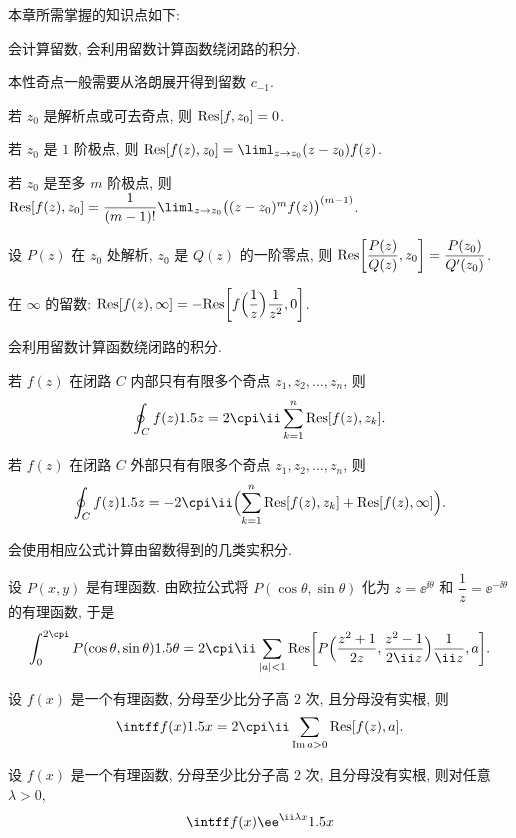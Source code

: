 本章所需掌握的知识点如下:
\begin{conclusion}
  \item 会计算留数, 会利用留数计算函数绕闭路的积分.
  \begin{conclusion}
    \item 本性奇点一般需要从洛朗展开得到留数 $c_{-1}$.
    \item 若 $z_0$ 是解析点或可去奇点, 则 ${\mathrm{Res}}[f,z_0]=0$.
    \item 若 $z_0$ 是 $1$ 阶极点, 则 $\Res[f(z),z_0]=\liml_{z\ra z_0}(z-z_0)f(z)$.
    \item 若 $z_0$ 是至多 $m$ 阶极点, 则 $\Res[f(z),z_0]=\dfrac1{(m-1)!}\liml_{z\ra z_0}\bigl((z-z_0)^mf(z)\bigr)^{(m-1)}$.
    \item 设 $P(z)$ 在 $z_0$ 处解析, $z_0$ 是 $Q(z)$ 的一阶零点, 则 ${\mathrm{Res}}\biggl[\dfrac{P(z)}{Q(z)},z_0\biggr]=\dfrac{P(z_0)}{Q'(z_0)}$.
    \item 在 $\infty$ 的留数: ${\mathrm{Res}}[f(z),\infty]
        =-{\mathrm{Res}}\biggl[f\Bigl(\dfrac1z\Bigr)\dfrac1{z^2},0\biggr]$.
  \end{conclusion}
  \item 会利用留数计算函数绕闭路的积分.
  \begin{conclusion}
    \item 若 $f(z)$ 在闭路 $C$ 内部只有有限多个奇点 $z_1,z_2,\dots,z_n$, 则
    \[
      \oint_C f(z)\d z=2\cpi\ii\sum_{k=1}^n\Res[f(z),z_k].
    \]
    \item 若 $f(z)$ 在闭路 $C$ 外部只有有限多个奇点 $z_1,z_2,\dots,z_n$, 则
    \[
      \oint_C f(z)\d z=-2\cpi\ii\Bigl(\sum_{k=1}^n\Res[f(z),z_k]+\Res[f(z),\infty]\Bigr).
    \]
  \end{conclusion}
  \item 会使用相应公式计算由留数得到的几类实积分.
  \begin{conclusion}
    \item 设 $P(x,y)$ 是有理函数.
    由欧拉公式将 $P(\cos \theta,\sin\theta)$ 化为 $z=\ee^{\ii\theta}$ 和 $\dfrac1z=\ee^{-\ii\theta}$ 的有理函数, 于是
    \[
        \int_0^{2\cpi}P(\cos \theta,\sin\theta)\d\theta
      =2\cpi\ii\sum_{|a|<1}\Res\biggl[P\Bigl(\frac{z^2+1}{2z},\frac{z^2-1}{2\ii z}\Bigr)\frac1{\ii z},a\biggr].
    \]
    \item 设 $f(x)$ 是一个有理函数, 分母至少比分子高 $2$ 次, 且分母没有实根, 则
    \[
       \intff f(x)\d x
      =2\cpi\ii\sum_{\Im a>0}\Res[f(z),a].
    \]
    \item 设 $f(x)$ 是一个有理函数, 分母至少比分子高 $2$ 次, 且分母没有实根, 则对任意 $\lambda>0$,
    \[
       \intff f(x)\ee^{\ii \lambda x}\d x
\]
\end{conclusion}
\end{conclusion}
